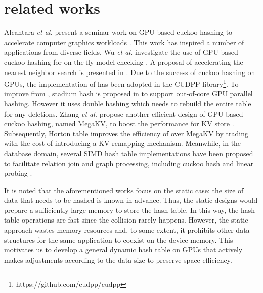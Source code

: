 \section{related works}\label{sec:rel}
Alcantara \textit{et al.} present a seminar work on GPU-based cuckoo hashing to accelerate computer graphics workloads \cite{alcantara2009real}. 
This work has inspired a number of applications from diverse fields. Wu \textit{et al.} investigate the use of GPU-based cuckoo hashing for
on-the-fly model checking \cite{wu2015gpu}. A proposal of accelerating the nearest neighbor search is presented in \cite{pan2010efficient}. 
Due to the success of cuckoo hashing on GPUs, the implementation of \cite{alcantara2009real} has been adopted in the CUDPP library\footnote{https://github.com/cudpp/cudpp}.
To improve from \cite{alcantara2009real}, stadium hash is proposed in \cite{khorasani2015stadium} to support out-of-core GPU parallel hashing. However it uses double hashing which needs to rebuild the entire table for any deletions.  
Zhang \textit{et al.} propose another efficient design of GPU-based cuckoo hashing, named MegaKV, 
to boost the performance for KV store \cite{zhang2015mega}. 
Subsequently, Horton table \cite{breslow2016horton} improves the efficiency of  over MegaKV by trading with the cost of introducing a KV remapping mechanism.
Meanwhile, in the database domain, several SIMD hash table implementations have been proposed to facilitate relation join and graph processing, including cuckoo hash \cite{ross2007efficient} and linear probing \cite{zhong2014medusa}. 

It is noted that the aforementioned works focus on the static case: the size of data that needs to be hashed is known in advance. Thus, the static designs would prepare a sufficiently large memory to store the hash table. In this way, the hash table operations are fast since the collision rarely happens. However, the static approach wastes memory resources and, to some extent, it prohibits other data structures for the same application to coexist on the device memory. 
This motivates us to develop a general dynamic hash table on GPUs that actively makes adjustments according to the data size to preserve space efficiency. 

